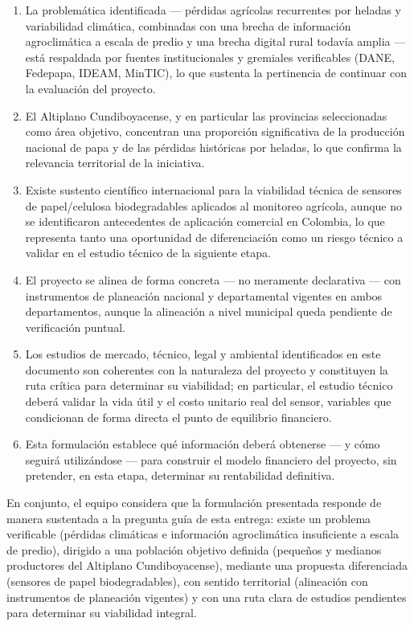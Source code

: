 \documentclass[11pt,a4paper]{article}
\begin{document}
\begin{enumerate}
\item La problemática identificada --- pérdidas agrícolas recurrentes por heladas y variabilidad climática, combinadas con una brecha de información agroclimática a escala de predio y una brecha digital rural todavía amplia --- está respaldada por fuentes institucionales y gremiales verificables (DANE, Fedepapa, IDEAM, MinTIC), lo que sustenta la pertinencia de continuar con la evaluación del proyecto.
\item El Altiplano Cundiboyacense, y en particular las provincias seleccionadas como área objetivo, concentran una proporción significativa de la producción nacional de papa y de las pérdidas históricas por heladas, lo que confirma la relevancia territorial de la iniciativa.
\item Existe sustento científico internacional para la viabilidad técnica de sensores de papel/celulosa biodegradables aplicados al monitoreo agrícola, aunque no se identificaron antecedentes de aplicación comercial en Colombia, lo que representa tanto una oportunidad de diferenciación como un riesgo técnico a validar en el estudio técnico de la siguiente etapa.
\item El proyecto se alinea de forma concreta --- no meramente declarativa --- con instrumentos de planeación nacional y departamental vigentes en ambos departamentos, aunque la alineación a nivel municipal queda pendiente de verificación puntual.
\item Los estudios de mercado, técnico, legal y ambiental identificados en este documento son coherentes con la naturaleza del proyecto y constituyen la ruta crítica para determinar su viabilidad; en particular, el estudio técnico deberá validar la vida útil y el costo unitario real del sensor, variables que condicionan de forma directa el punto de equilibrio financiero.
\item Esta formulación establece qué información deberá obtenerse --- y cómo seguirá utilizándose --- para construir el modelo financiero del proyecto, sin pretender, en esta etapa, determinar su rentabilidad definitiva.
\end{enumerate}

\noindent En conjunto, el equipo considera que la formulación presentada responde de manera sustentada a la pregunta guía de esta entrega: existe un problema verificable (pérdidas climáticas e información agroclimática insuficiente a escala de predio), dirigido a una población objetivo definida (pequeños y medianos productores del Altiplano Cundiboyacense), mediante una propuesta diferenciada (sensores de papel biodegradables), con sentido territorial (alineación con instrumentos de planeación vigentes) y con una ruta clara de estudios pendientes para determinar su viabilidad integral.
\end{document}
